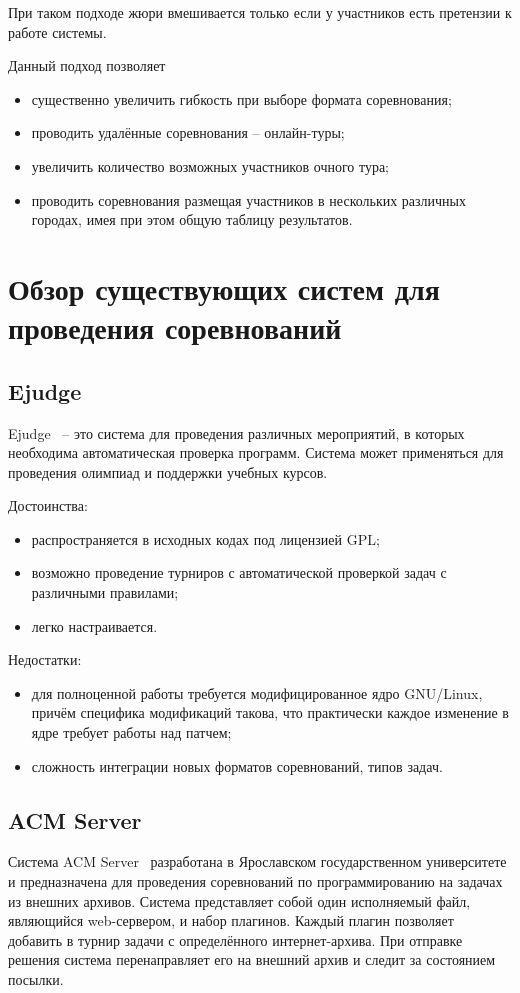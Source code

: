 При таком подходе жюри вмешивается только если у участников есть претензии к работе системы.

Данный подход позволяет
\begin{itemize}
    \item существенно увеличить гибкость при выборе формата соревнования;
    \item проводить удалённые соревнования -- онлайн-туры;
    \item увеличить количество возможных участников очного тура;
    \item проводить соревнования размещая участников в нескольких различных городах,
        имея при этом общую таблицу результатов.
\end{itemize}

\section{Обзор существующих систем для проведения соревнований}
\subsection{Ejudge}
Ejudge~\cite{ejudge} -- это система для проведения различных мероприятий,
в которых необходима автоматическая проверка программ.
Система может применяться для проведения олимпиад и поддержки учебных курсов.

Достоинства:
\begin{itemize}
    \item распространяется в исходных кодах под лицензией GPL;
    \item возможно проведение турниров с автоматической проверкой задач с различными правилами;
    \item легко настраивается.
\end{itemize}

Недостатки:
\begin{itemize}
    \item для полноценной работы требуется модифицированное ядро GNU/Linux,
        причём специфика модификаций такова, что практически каждое изменение в ядре
        требует работы над патчем;
    \item сложность интеграции новых форматов соревнований, типов задач.
\end{itemize}

\subsection{ACM Server}
Система ACM Server~\cite{acmserver} разработана в Ярославском государственном
университете и предназначена для проведения соревнований по программированию на задачах из внешних архивов.
Система представляет собой один исполняемый файл, являющийся web-сервером, и набор плагинов.
Каждый плагин позволяет добавить в турнир задачи с определённого интернет-архива.
При отправке решения система перенаправляет его на внешний архив и следит за состоянием посылки.

